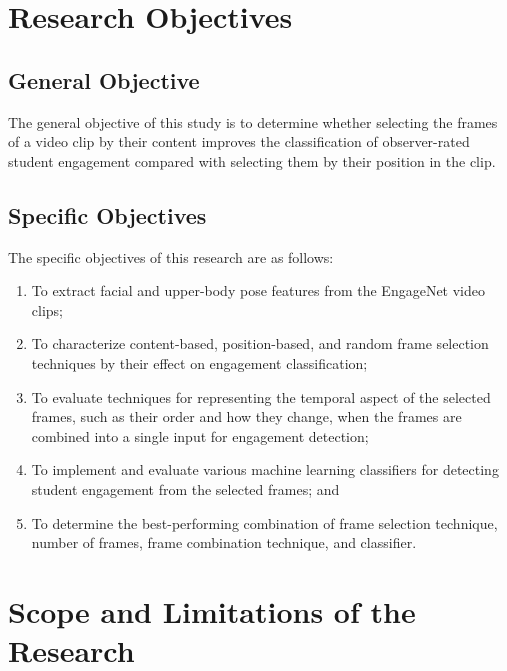 
\section{Research Objectives}
\label{sec:objectives}

\subsection{General Objective}

The general objective of this study is to determine whether selecting the frames of a video clip by their content improves the classification of observer-rated student engagement compared with selecting them by their position in the clip.

\subsection{Specific Objectives}

The specific objectives of this research are as follows:
\begin{enumerate}
   \item To extract facial and upper-body pose features from the EngageNet video clips;
   \item To characterize content-based, position-based, and random frame selection techniques by their effect on engagement classification;
   \item To evaluate techniques for representing the temporal aspect of the selected frames, such as their order and how they change, when the frames are combined into a single input for engagement detection;
   \item To implement and evaluate various machine learning classifiers for detecting student engagement from the selected frames; and
   \item To determine the best-performing combination of frame selection technique, number of frames, frame combination technique, and classifier.
\end{enumerate}



\section{Scope and Limitations of the Research}
\label{sec:scopelimitations}

